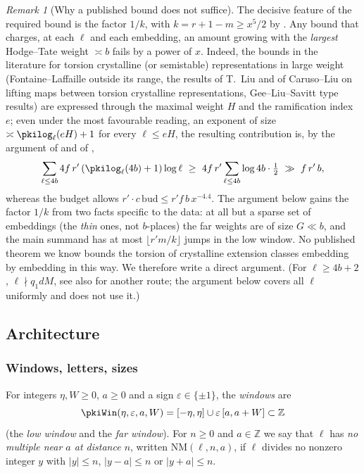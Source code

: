 \documentclass[10pt]{amsart}
\theoremstyle{definition}
\theoremstyle{remark}
\newtheorem{remark}[theorem]{Remark}
\newcommand{\Z}{\mathbb Z}
\providecommand{\aubud}{\mathrm{bud}}
\begin{document}
\begin{remark}[Why a published bound does not suffice]\label{pki:rem-published}
The decisive feature of the required bound is the factor $1/k$, with $k=r+1-m\ge x^5/2$ by
{\cite[(36)]{P46}}. Any bound that charges, at each $\ell$ and each embedding, an amount growing
with the \emph{largest} Hodge--Tate weight $\asymp b$ fails by a power of $x$. Indeed, the bounds
in the literature for torsion crystalline (or semistable) representations in large weight
(Fontaine--Laffaille outside its range, the results of T.~Liu and of Caruso--Liu on lifting maps
between torsion crystalline representations, Gee--Liu--Savitt type results) are expressed through
the maximal weight $H$ and the ramification index $e$; even under the most favourable reading,
an exponent of size $\asymp\pkilog_\ell(eH)+1$ for every $\ell\le eH$, the resulting contribution
is, by the argument of {\cite[Lemma~5.6]{P55}} and of {\cite[Lemma~5.10]{P55}},
\[
\sum_{\ell\le 4b}4f\,r'\,(\pkilog_\ell(4b)+1)\log\ell\ \ge\ 4f\,r'\sum_{\ell\le4b}\log 4b\cdot\tfrac12
\ \gg\ f\,r'\,b,
\]
whereas the budget allows $r'\cdot c\,\aubud\le r'f\,b\,x^{-4.4}$. The argument below gains the
factor $1/k$ from two facts specific to the data: at all but a sparse set of embeddings (the
\emph{thin} ones, not $b$-places) the far weights are of size $G\ll b$, and the main summand has at
most $\lfloor r'm/k\rfloor$ jumps in the low window. No published theorem we know bounds the
torsion of crystalline extension classes embedding by embedding in this way. We therefore write a
direct argument. (For $\ell\ge4b+2$, $\ell\nmid q_1dM$, see also {\cite[Remark~5.7]{P55}} for another route;
the argument below covers all $\ell$ uniformly and does not use it.)
\end{remark}

\subsection{Architecture}\label{pki:ss-arch}

\subsubsection*{Windows, letters, sizes}

For integers $\eta,W\ge0$, $a\ge0$ and a sign $\varepsilon\in\{\pm1\}$, the \emph{windows} are
\[
\pkiWin(\eta,\varepsilon,a,W)=[-\eta,\eta]\cup\varepsilon\,[a,a+W]\subset\Z
\]
(the \emph{low window} and the \emph{far window}). For $n\ge0$ and $a\in\Z$ we say that $\ell$ has
\emph{no multiple near $a$ at distance $n$}, written $\mathrm{NM}(\ell,n,a)$, if $\ell$ divides no
nonzero integer $y$ with $|y|\le n$, $|y-a|\le n$ or $|y+a|\le n$.
\end{document}
